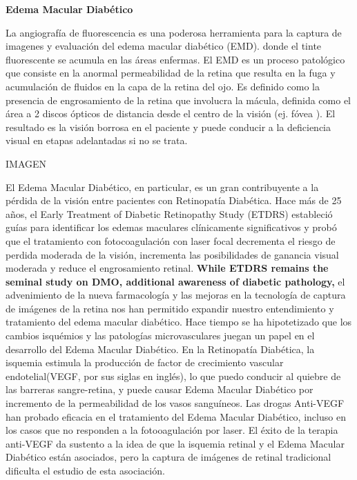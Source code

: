 \textbf{Edema Macular Diabético}

La angiografía de fluorescencia es una poderosa herramienta para la captura de imagenes y evaluación del edema macular diabético (EMD). donde el tinte fluorescente se acumula en las áreas enfermas.
El EMD es un proceso patológico que consiste en la anormal permeabilidad de la retina que resulta en la fuga y acumulación de fluidos en la capa de la retina del ojo. Es definido como la presencia de engrosamiento de la retina que involucra la mácula, definida como el área a 2 discos ópticos de distancia desde el centro de la visión (ej. fóvea ). El resultado es la visión borrosa en el paciente y puede conducir a la deficiencia visual en etapas adelantadas si no se trata. \cite{el2011segmentation}

IMAGEN

El Edema Macular Diab\'etico, en particular, es un gran contribuyente a la p\'erdida de la visi\'on  entre pacientes con Retinopat\'ia Diab\'etica. Hace m\'as de 25 a\~nos, el Early Treatment of Diabetic Retinopathy Study (ETDRS) estableci\'o gu\'ias para identificar los edemas maculares cl\'inicamente significativos y prob\'o que el tratamiento con fotocoagulaci\'on con laser focal decrementa el riesgo de perdida moderada de la visi\'on, incrementa las posibilidades de ganancia visual moderada y reduce el engrosamiento retinal. \textbf{While ETDRS remains the seminal study on DMO, additional awareness of diabetic pathology,} el advenimiento de la nueva farmacolog\'ia y las mejoras en la tecnolog\'ia de captura de im\'agenes de la retina nos han permitido expandir nuestro entendimiento y tratamiento del edema macular diab\'etico.
Hace tiempo se ha hipotetizado que los cambios isqu\'emios y las patolog\'ias microvasculares  juegan un papel en el desarrollo del Edema Macular Diab\'etico. En la Retinopat\'ia Diab\'etica, la isquemia estimula la producci\'on de factor de crecimiento vascular endotelial(VEGF, por sus siglas en ingl\'es), lo que puedo conducir al quiebre de las barreras sangre-retina, y puede causar Edema Macular Diab\'etico por incremento de la permeabilidad de los vasos sangu\'ineos. Las drogas Anti-VEGF han probado eficacia en el tratamiento del Edema Macular Diab\'etico, incluso en los casos que no responden a la fotooagulaci\'on por laser. El \'exito de la terapia anti-VEGF da sustento a la idea de que la isquemia retinal y el Edema Macular Diab\'etico est\'an asociados, pero la captura de im\'agenes de retinal tradicional dificulta el estudio de esta asociaci\'on.
